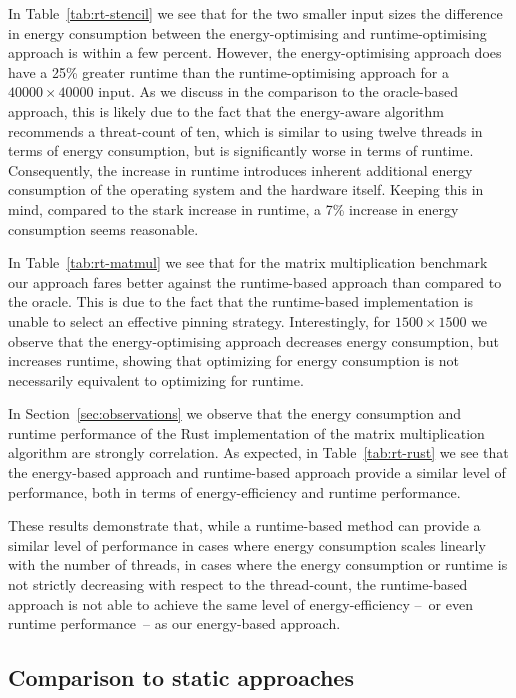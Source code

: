 In Table~\ref{tab:rt-stencil} we see that for the two smaller input sizes the difference in energy
consumption between the energy-optimising and runtime-optimising approach is within a few percent.
However, the energy-optimising approach does have a 25\% greater runtime than the runtime-optimising
approach for a $40000 \times 40000$ input. As we discuss in the comparison to the oracle-based
approach, this is likely due to the fact that the energy-aware algorithm recommends a threat-count
of ten, which is similar to using twelve threads in terms of energy consumption, but is
significantly worse in terms of runtime. Consequently, the increase in runtime introduces inherent
additional energy consumption of the operating system and the hardware itself. Keeping this in mind,
compared to the stark increase in runtime, a 7\% increase in energy consumption seems reasonable.

In Table~\ref{tab:rt-matmul} we see that for the matrix multiplication benchmark our approach fares
better against the runtime-based approach than compared to the oracle. This is due to the fact that
the runtime-based implementation is unable to select an effective pinning strategy. Interestingly,
for $1500 \times 1500$ we observe that the energy-optimising approach decreases energy consumption,
but increases runtime, showing that optimizing for energy consumption is not necessarily equivalent
to optimizing for runtime.

In Section~\ref{sec:observations} we observe that the energy consumption and runtime performance of
the Rust implementation of the matrix multiplication algorithm are strongly correlation. As
expected, in Table~\ref{tab:rt-rust} we see that the energy-based approach and runtime-based
approach provide a similar level of performance, both in terms of energy-efficiency and runtime
performance.

These results demonstrate that, while a runtime-based method can provide a similar level of
performance in cases where energy consumption scales linearly with the number of threads, in cases
where the energy consumption or runtime is not strictly decreasing with respect to the thread-count,
the runtime-based approach is not able to achieve the same level of energy-efficiency --~or even
runtime performance~-- as our energy-based approach.

\subsection{Comparison to static approaches}\label{sec:evalation-static}

